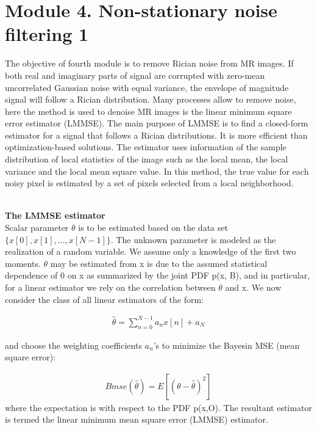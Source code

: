 \section{Module 4. Non-stationary noise filtering 1}

The objective of fourth module is to remove Rician noise from MR images. If
both real and imaginary parts of signal are corrupted with zero-mean
uncorrelated Gaussian noise with equal variance, the envelope of magnitude
signal will follow a Rician distribution. Many processes allow to
remove noise, here the method is used to denoise MR images is the
linear minimum square error estimator (LMMSE). The main purpose of
LMMSE is to find a closed-form estimator for a signal that follows
a Rician distributions. It is more efficient than optimization-based
solutions. The estimator uses information of the sample distribution of local statistics of the image such as the local mean, the local variance and the local mean square value. In this method, the true
value for each noisy pixel is estimated by a set of pixels selected from a local neighborhood.

\hfill{}\\
\textbf{The LMMSE estimator}\\

Scalar parameter $\theta$ is to be estimated based on the data set $\{x[0],x[1], ... , x[N - 1]\}$. The unknown parameter is modeled as the realization of a random variable. We assume only a knowledge of the first two moments. $\theta$ may be estimated from x is due to the assumed statistical dependence of 0 on x as summarized by the joint PDF p(x, B), and in particular, for a linear estimator we rely on the correlation between $\theta$ and x. We now consider the class of all linear estimators of the form:

\begin{equation}
\begin{aligned}\widehat{\theta}=\sum\limits_{n=0}^{N-1} a_nx[n]+a_N \end{aligned}
\label{m4eq0}
\end{equation}

and choose the weighting coefficients $a_n$'s to minimize the Bayesin MSE (mean square error):

\begin{equation}
\begin{aligned}Bmse(\widehat{\theta})=E[(\theta - \widehat{\theta})^2] \end{aligned}
\label{m4eq1-1}
\end{equation}
where the expectation is with respect to the PDF p(x,O). The resultant estimator is
termed the linear minimum mean square error (LMMSE) estimator.

